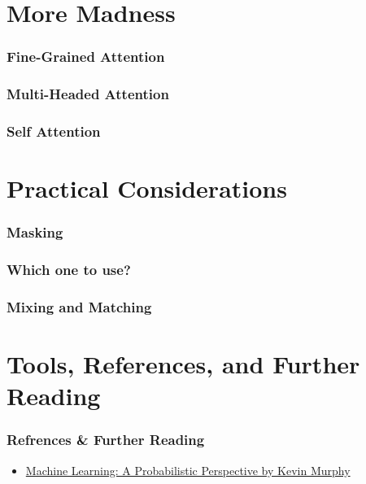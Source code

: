 \documentclass{beamer}
\begin{document}
\section{More Madness}

\begin{frame}
\frametitle{Fine-Grained Attention}

\end{frame}

\begin{frame}
\frametitle{Multi-Headed Attention}

\end{frame}

\begin{frame}
\frametitle{Self Attention}

\end{frame}

\section{Practical Considerations}

\begin{frame}
\frametitle{Masking}

\end{frame}

\begin{frame}
\frametitle{Which one to use?}

\end{frame}

\begin{frame}
\frametitle{Mixing and Matching}

\end{frame}


\section{Tools, References, and Further Reading}


\begin{frame}
\frametitle{Refrences \& Further Reading}
  \begin{itemize}
    \item \href{https://www.cs.ubc.ca/~murphyk/MLbook/}{Machine Learning: A Probabilistic Perspective by Kevin Murphy}
  \end{itemize}
\end{frame}


\end{document}
